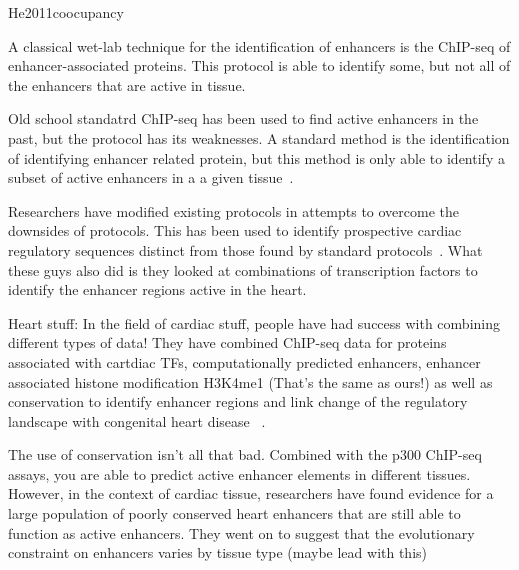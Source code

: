 He2011coocupancy

A classical wet-lab technique for the identification of enhancers is the ChIP-seq of enhancer-associated proteins. 
This protocol is able to identify some, but not all of the enhancers that are active in tissue.

Old school standatrd ChIP-seq has been used to find active enhancers in the past, but the protocol has its weaknesses. A standard method is the identification of identifying enhancer related protein, but this method is only able to identify a subset of active enhancers in a a given tissue~\cite{heintzman2007distinct}.  

Researchers have modified existing protocols in attempts to overcome the downsides of protocols. This has been used to identify prospective cardiac regulatory sequences distinct from those found by standard protocols~\cite{he2011co}. What these guys also did is they looked at combinations of transcription factors to identify the enhancer regions active in the heart.

Heart stuff: In the field of cardiac stuff, people have had success with combining different types of data! They have combined ChIP-seq data for proteins associated with cartdiac TFs, computationally predicted enhancers, enhancer associated histone modification H3K4me1 (That's the same as ours!) as well as conservation to identify enhancer regions and link change of the regulatory landscape with congenital heart disease ~\cite{smemo2012regulatory}.  

The use of conservation isn't all that bad. Combined with the p300 ChIP-seq assays, you are able to predict active enhancer elements in different tissues. However, in the context of cardiac tissue, researchers have found evidence for a large population of poorly conserved heart enhancers that are still able to function as active enhancers. They went on to suggest that the evolutionary constraint on enhancers varies by tissue type (maybe lead with this)~\cite{blow2010chip}

